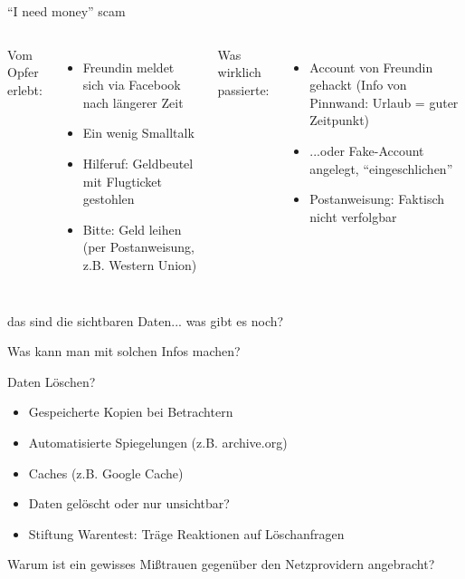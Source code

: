 \begin{frame}{"`I need money"' scam}
	\begin{columns}[t]
		Vom Opfer erlebt:
		\begin{itemize}
			\item Freundin meldet sich via Facebook nach längerer Zeit
			\item Ein wenig Smalltalk
			\item<2-> Hilferuf: Geldbeutel mit Flugticket gestohlen
			\item<2-> Bitte: Geld leihen (per Postanweisung, z.B. Western Union)
		\end{itemize}
		Was wirklich passierte:
		\begin{itemize}
			\item<3-> Account von Freundin gehackt (Info von Pinnwand: Urlaub = guter Zeitpunkt)
			\item<3-> ...oder Fake-Account angelegt, "`eingeschlichen"'
			\item<3-> Postanweisung: Faktisch nicht verfolgbar
		\end{itemize}
	\end{columns}
\end{frame}

\begin{frame}{das sind die sichtbaren Daten... was gibt es noch?}
\end{frame}

\begin{frame}{Was kann man mit solchen Infos machen?}
\end{frame}

\begin{frame}{Daten Löschen?}
	\begin{itemize}
		\item Gespeicherte Kopien bei Betrachtern
		\item Automatisierte Spiegelungen (z.B. archive.org)
		\item Caches (z.B. Google Cache)
		\item Daten gelöscht oder nur unsichtbar?
		\item Stiftung Warentest: Träge Reaktionen auf Löschanfragen
	\end{itemize}
\end{frame}

\begin{frame}{Warum ist ein gewisses Mißtrauen gegenüber den Netzprovidern angebracht?}
\end{frame}

